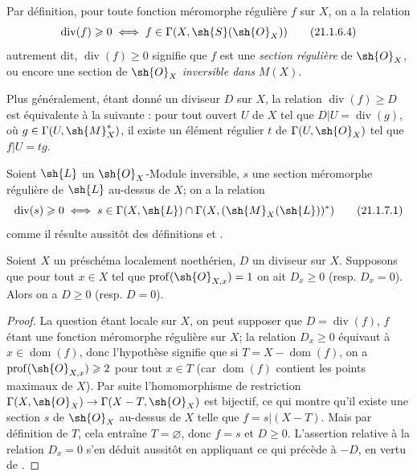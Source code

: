 Par définition, pour toute fonction méromorphe régulière $f$ sur $X$, on a la relation
\[
\label{IV.21.1.6.4}
  \operatorname{div}(f)\geq0 \iff f\in\Gamma(X,\sh{S}(\sh{O}_X))
  \tag{21.1.6.4}
\]
autrement dit, $\operatorname{div}(f)\geq0$ signifie que $f$ est une \emph{section régulière} de $\sh{O}_X$, ou encore une section de $\sh{O}_X$ \emph{inversible dans} $M(X)$.

Plus généralement, étant donné un diviseur $D$ sur $X$, la relation $\operatorname{div}(f)\geq D$ est équivalente à la suivante : pour tout ouvert $U$ de $X$ tel que $D|U=\operatorname{div}(g)$, où $g\in\Gamma(U,\sh{M}_X^*)$, il existe un élément régulier $t$ de $\Gamma(U,\sh{O}_X)$ tel que $f|U=tg$.

\begin{env}[21.1.7]
\label{IV.21.1.7}
Soient $\sh{L}$ un $\sh{O}_X$-Module inversible, $s$ une section méromorphe régulière de $\sh{L}$ au-dessus de $X$; on a la relation
\[
\label{IV.21.1.7.1}
  \operatorname{div}(s)\geq0 \iff s\in\Gamma(X,\sh{L})\cap\Gamma(X,(\sh{M}_X(\sh{L}))^*)
  \tag{21.1.7.1}
\]
comme il résulte aussitôt des définitions  et .
\end{env}

\begin{proposition}[21.1.8]
Soient $X$ un préschéma localement noethérien, $D$ un diviseur sur $X$.
Supposons que pour tout $x\in X$ tel que $\operatorname{prof}(\sh{O}_{X,x})=1$ on ait $D_x\geq0$ (resp. $D_x=0$).
Alors on a $D\geq0$ (resp. $D=0$).
\end{proposition}

\begin{proof}
La question étant locale sur $X$, on peut supposer que $D=\operatorname{div}(f)$, $f$ étant une
fonction méromorphe régulière sur $X$;
la relation $D_x\geq0$ équivaut à $x\in\operatorname{dom}(f)$, donc l'hypothèse signifie que si $T=X-\operatorname{dom}(f)$, on a $\operatorname{prof}(\sh{O}_{X,x})\geq2$ pour tout $x\in T$ (car $\operatorname{dom}(f)$ contient les points maximaux de $X$).
Par suite  l'homomorphisme de restriction $\Gamma(X,\sh{O}_X)\to\Gamma(X-T,\sh{O}_X)$ est bijectif, ce qui montre qu'il existe une section $s$ de $\sh{O}_X$ au-dessus de $X$ telle que $f=s|(X-T)$.
Mais par définition de $T$, cela entraîne $T=\varnothing$, donc $f=s$ et $D\geq0$.
L'assertion relative à la relation $D_x=0$ s'en déduit aussitôt en appliquant ce qui précède à $-D$, en vertu de .
\end{proof}


